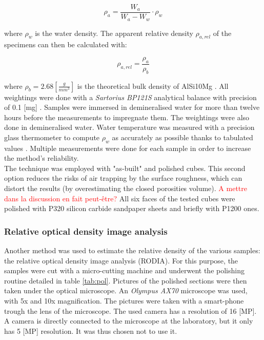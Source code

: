 $$\rho_a=\frac{W_a}{W_a-W_w} \cdot \rho_w $$

where $\rho_w$ is the water density. The apparent relative density $\rho_{a,rel}$ of the specimens can then be calculated with:

$$\rho_{a,rel} = \frac{\rho_a}{\rho_b} $$

where $\rho_b = 2.68 [\frac{g}{mm^3}]$ is the theoretical bulk density of AlSi10Mg \parencite{Bulk}. All weightings were done with a \textit{Sartorius BP121S} analytical balance with precision of 0.1 [mg] \parencite{Balance}. Samples were immersed in demineralised water for more than twelve hours before the measurements to impregnate them. The weightings were also done in demineralised water. Water temperature was measured with a precision glass thermometer to compute $\rho_w$ as accurately as possible thanks to tabulated values \parencite{Eau}. Multiple measurements were done for each sample in order to increase the method's reliability. \\

The technique was employed with "as-built" and polished cubes. This second option reduces the risks of air trapping by the surface roughness, which can distort the results (by overestimating the closed porosities volume). \textcolor{red}{A mettre dans la discussion en fait peut-être?} %
All six faces of the tested cubes were polished with P320 silicon carbide sandpaper sheets and briefly with P1200 ones.\\

\subsubsection{Relative optical density image analysis}

Another method was used to estimate the relative density of the various samples: the relative optical density image analysis (RODIA). For this purpose, the samples were cut with a micro-cutting machine and underwent the polishing routine detailed in table \ref{tab:pol}. Pictures of the polished sections were then taken under the optical microscope. An \textit{Olympus AX70} microscope was used, with 5x and 10x magnification. The pictures were taken with a smart-phone trough the lens of the microscope. The used camera has a resolution of 16 [MP]. A camera is directly connected to the microscope at the laboratory, but it only has 5 [MP] resolution. It was thus chosen not to use it. \\

